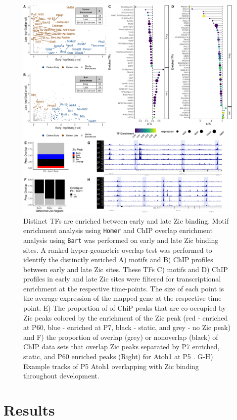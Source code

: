 \documentclass[fleqn,10pt]{wlscirep}
\begin{document}
\begin{figure}[!ht]
\centering
\includegraphics[width=.95\textwidth]{../figures/figure2.png}
\caption{ Distinct TFs are enriched between early and late Zic binding. Motif enrichment analysis using \texttt{Homer} and ChIP overlap enrichment analysis using \texttt{Bart} was performed on early and late Zic binding sites. A ranked hyper-geometric overlap test was performed to identify the distinctly enriched A) motifs and B) ChIP profiles between early and late Zic sites. These TFs C) motifs and D) ChIP profiles in early and late Zic sites were filtered for transcriptional enrichment at the respective time-points. The size of each point is the average expression of the mapped gene at the respective time point. E) The proportion of of ChiP peaks that are co-occupied by Zic peaks colored by the enrichment of the Zic peak (red - enriched at P60, blue - enriched at P7, black - static, and grey - no Zic peak) and F) the proportion of overlap (grey) or nonoverlap (black) of ChIP data sets that overlap Zic peaks separated by P7 enriched, static, and P60 enriched peaks (Right) for Atoh1 at P5 \cite{Klisch2011InDevelopment}. G-H) Example tracks of P5 Atoh1 overlapping with Zic binding throughout development. }
\label{fig:DistinctTFs}
\end{figure}

\section*{Results}
\end{document}
